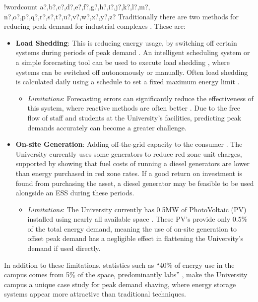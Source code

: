 \documentclass[fontsize=9.5pt]{extarticle}
\providecommand{\tightlist}{%
  \setlength{\itemsep}{0pt}\setlength{\parskip}{0pt}}
\newcounter{words}
\newenvironment{counted}{%
  \setcounter{words}{0}
  \SearchList!{wordcount}{\stepcounter{words}}
    {a?,b?,c?,d?,e?,f?,g?,h?,i?,j?,k?,l?,m?,
    n?,o?,p?,q?,r?,s?,t?,u?,v?,w?,x?,y?,z?}
  \UndoBoundary{'}
  \SearchOrder{p;}}{%
  \StopSearching}
\begin{document}
\begin{counted}
Traditionally there are two methods for reducing peak demand for
industrial complexes \cite{schneiderRECPS}. These are:

\begin{itemize}
\tightlist
\item
  \textbf{Load Shedding}: This is reducing energy usage, by switching
  off certain systems during periods of peak demand \cite{6199851}. An
  intelligent scheduling system or a simple forecasting tool can be used
  to execute load shedding \cite{Reducing37:online}, where systems can
  be switched off autonomously or manually. Often load shedding is
  calculated daily using a schedule to set a fixed maximum energy limit
  \cite{6938948}.

  \begin{itemize}
  \tightlist
  \item
    \emph{Limitations}: Forecasting errors can significantly reduce the
    effectiveness of this system, where reactive methods are often
    better \cite{6938948}. Due to the free flow of staff and students at
    the University's facilities, predicting peak demands accurately can
    become a greater challenge.
  \end{itemize}
\item
  \textbf{On-site Generation}: Adding off-the-grid capacity to the
  consumer \cite{schneiderRECPS}. The University currently uses some
  generators to reduce red zone unit charges, supported by
  \cite{shen2016} showing that fuel costs of running a diesel generators
  are lower than energy purchased in red zone rates. If a good return on
  investment is found from purchasing the asset, a diesel generator may
  be feasible to be used alongside an ESS during these periods.

  \begin{itemize}
  \tightlist
  \item
    \emph{Limitations}: The University currently has 0.5MW of
    PhotoVoltaic (PV) installed using nearly all available space
    \cite{Jbrentmeet}. These PV's provide only 0.5\% of the total energy
    demand, meaning the use of on-site generation to offset peak demand
    has a negligible effect in flattening the University's demand if
    used directly.
  \end{itemize}
\end{itemize}

In addition to these limitations, statistics such as ``40\% of energy
use in the campus comes from 5\% of the space, predominantly labs''
\cite{brentemail}, make the University campus a unique case study for
peak demand shaving, where energy storage systems appear more attractive
than traditional techniques.


\end{counted}
\end{document}
